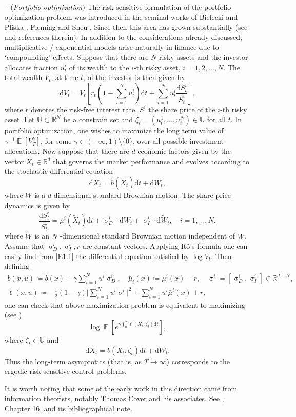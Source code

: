 \documentclass[notitlepage,11pt,reqno]{amsart}
\numberwithin{equation}{section}
\theoremstyle{plain}
\theoremstyle{definition}
\theoremstyle{remark}
\newcommand{\Act}{{\mathds{U}}}
\newcommand{\RR}{\mathds{R}} %
\newcommand{\Rd}{{\mathds{R}^{d}}}
\DeclareMathOperator{\Exp}{\mathbb{E}} %
\newcommand{\D}{\mathrm{d}} %
\newcommand{\abs}[1]{\lvert#1\rvert}
\newcommand{\df}{\coloneqq}
\begin{document}
\begin{itemize}
\item[--] ({\it Portfolio optimization}) The risk-sensitive formulation of the portfolio optimization problem was introduced in the seminal works of 
Bielecki and Pliska \cite{MR1675114}, Fleming and Sheu \cite{MR1722286}. Since then this area has grown substantially (see \cites{MR1802598,MR1910647,MR1890061,MR1972534,MR2193508} and references therein). In addition to the considerations already discussed, multiplicative / exponential models arise naturally in finance due to `compounding' effects. Suppose that there
are $N$ risky assets and the investor allocates fraction $u^i_t$ of its wealth to the $i$-th risky asset, $i=1, 2, \ldots, N$. The total wealth $V_t$, at time $t$, of the investor 
is then given by
\begin{equation}\label{E1.1}
\D{V}_t= V_t\left[ r_t \left(1-\sum_{i=1}^N u^i_t\right) \D{t}+\sum_{i=1}^N u^i_t \frac{\D{S}^i_t}{S^i_t}\right],
\end{equation}
where $r$ denotes the risk-free interest rate, $S^i$ the share price of the $i$-th risky asset. Let $\Act\subset\RR^N$ be a constrain set and $\zeta_t=(u^1_t, \ldots, u^N_t)\in \Act$ for all $t$.
In portfolio optimization, one wishes to maximize the long term value of $\gamma^{-1}\Exp[V^\gamma_T]$, for some $\gamma\in (-\infty, 1)\setminus\{0\}$, over all possible
investment allocations. Now suppose that there are $d$ economic factors given by the vector $\tilde{X}_t\in\Rd$ that governs the market performance and evolves according to
the stochastic differential equation
$$\D{\tilde{X}_t}=\tilde{b}(\tilde{X}_t)\D{t} + \D{W}_t,$$
where $W$ is a $d$-dimensional standard Brownian motion. The share price dynamics is given by
$$\frac{\D{S}^i_t}{S^i_t}= \mu^i(\tilde{X}_t) \D{t} + \upsigma^i_D \cdot \D{W}_t + \upsigma^i_I \cdot \D{\tilde{W}}_t, \quad i=1, \ldots, N, $$
where $\tilde{W}$ is an $N$ -dimensional standard Brownian motion independent of $W$. Assume that $\upsigma^i_D, \upsigma^i_I, r$ are constant vectors. Applying It\^{o}'s formula one 
can easily find from \eqref{E1.1} the differential equation satisfied by $\log V_t$.
Then defining
\begin{gather*}
b(x, u)\df \tilde{b}(x) + \gamma\sum_{i=1}^N u^i \upsigma^i_D, \quad \bar\mu_i(x)\df \mu^i(x)-r, \quad 
\upsigma^i=[\upsigma^i_D, \upsigma^i_I]\in\RR^{d+N},
\\
\ell(x, u)\df-\frac{1}{2}(1-\gamma)\abs{\sum_{i=1}^N u^i \upsigma^i}^2 + \sum_{i=1}^N u^i \bar\mu^i(x) + r,
\end{gather*}
one can check that above maximization problem is equivalent to maximizing (see \cite{MR1910647})
$$\log\Exp\left[e^{\gamma \int_0^T \ell(X_t, \zeta_t)\D{t}}\right],$$
where $\zeta_t\in\Act$ and 
$$\D{X}_t=b(X_t, \zeta_t)\D{t} + \D{W}_t.$$
Thus the long-term asymptotics (that is, as $T\to\infty$) corresponds to the ergodic risk-sensitive control problems.

It is worth noting that some of the early work in this direction came from information theorists, notably Thomas Cover and his associates. See \cite{Cover}, Chapter 16, and its bibliographical note.
\end{itemize}
\end{document}
